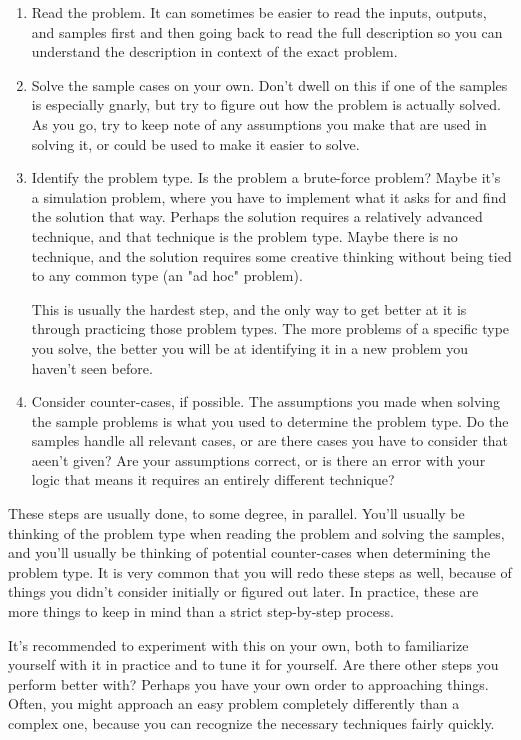 \begin{enumerate}
\item Read the problem. It can sometimes be easier to read the inputs, outputs, and samples first and then going back to read the full description so you can understand the description in context of the exact problem.
\item Solve the sample cases on your own. Don't dwell on this if one of the samples is especially gnarly, but try to figure out how the problem is actually solved. As you go, try to keep note of any assumptions you make that are used in solving it, or could be used to make it easier to solve.
\item Identify the problem type. Is the problem a brute-force problem? Maybe it's a simulation problem, where you have to implement what it asks for and find the solution that way. Perhaps the solution requires a relatively advanced technique, and that technique is the problem type. Maybe there is no technique, and the solution requires some creative thinking without being tied to any common type (an "ad hoc" problem).

This is usually the hardest step, and the only way to get better at it is through practicing those problem types. The more problems of a specific type you solve, the better you will be at identifying it in a new problem you haven't seen before.
\item Consider counter-cases, if possible. The assumptions you made when solving the sample problems is what you used to determine the problem type. Do the samples handle all relevant cases, or are there cases you have to consider that aeen't given? Are your assumptions correct, or is there an error with your logic that means it requires an entirely different technique?
\end{enumerate}

These steps are usually done, to some degree, in parallel. You'll usually be thinking of the problem type when reading the problem and solving the samples, and you'll usually be thinking of potential counter-cases when determining the problem type. It is very common that you will redo these steps as well, because of things you didn't consider initially or figured out later. In practice, these are more things to keep in mind than a strict step-by-step process.

It's recommended to experiment with this on your own, both to familiarize yourself with it in practice and to tune it for yourself. Are there other steps you perform better with? Perhaps you have your own order to approaching things. Often, you might approach an easy problem completely differently than a complex one, because you can recognize the necessary techniques fairly quickly.


